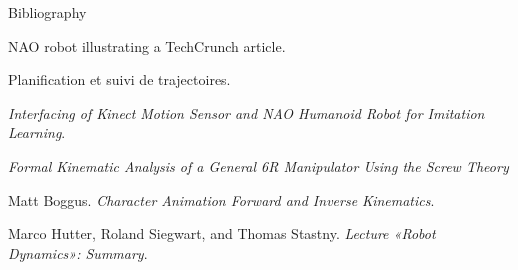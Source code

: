 \documentclass{beamer}
\begin{document}
\begin{frame}[allowframebreaks]{Bibliography}
	\begin{thebibliography}{9}

		NAO robot illustrating a TechCrunch article.

		Planification et suivi de trajectoires.

		\textit{Interfacing of Kinect Motion Sensor and NAO Humanoid Robot for Imitation Learning}.

		\textit{Formal Kinematic Analysis of a General 6R Manipulator Using the Screw Theory}

		Matt Boggus.
		\textit{Character Animation Forward and Inverse Kinematics}.

		Marco Hutter, Roland Siegwart, and Thomas Stastny.
		\textit{Lecture «Robot Dynamics»: Summary}.
	\end{thebibliography}
\end{frame}
\end{document}
